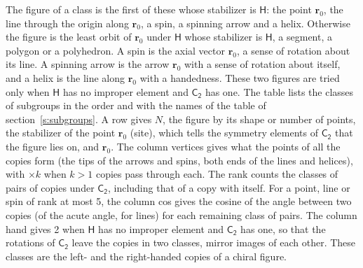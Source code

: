 \documentclass[10pt,a4paper]{article}
\numberwithin{equation}{section}
\newcommand{\grp}[1]{\mathsf{#1}}
\newcommand{\pointr}{\mathbf{r}}
\begin{document}
\leavevmode\label{n:head.figure}The figure of a class is the first of these whose stabilizer is $\grp{H}$: the point $\pointr_0$, the line through the origin along $\pointr_0$, a spin, a spinning arrow and a helix. Otherwise the figure is the least orbit of $\pointr_0$ under $\grp{H}$ whose stabilizer is $\grp{H}$, a segment, a polygon or a polyhedron. A spin is the axial vector $\pointr_0$, a sense of rotation about its line. A spinning arrow is the arrow $\pointr_0$ with a sense of rotation about itself, and a helix is the line along $\pointr_0$ with a handedness. These two figures are tried only when $\grp{H}$ has no improper element and $\grp{C_{2}}$ has one. The table lists the classes of subgroups in the order and with the names of the table of section~\ref{s:subgroups}. \label{n:head.site}A row gives $N$, the figure by its shape or number of points, the stabilizer of the point $\pointr_0$ (site), which tells the symmetry elements of $\grp{C_{2}}$ that the figure lies on, and $\pointr_0$. \label{n:head.vertices}The column vertices gives what the points of all the copies form (the tips of the arrows and spins, both ends of the lines and helices), with ${\times}k$ when $k > 1$ copies pass through each. \label{n:head.rank}The rank counts the classes of pairs of copies under $\grp{C_{2}}$, including that of a copy with itself. \label{n:head.cos}For a point, line or spin of rank at most 5, the column cos gives the cosine of the angle between two copies (of the acute angle, for lines) for each remaining class of pairs. \label{n:head.hand}The column hand gives 2 when $\grp{H}$ has no improper element and $\grp{C_{2}}$ has one, so that the rotations of $\grp{C_{2}}$ leave the copies in two classes, mirror images of each other. These classes are the left- and the right-handed copies of a chiral figure.
\end{document}
